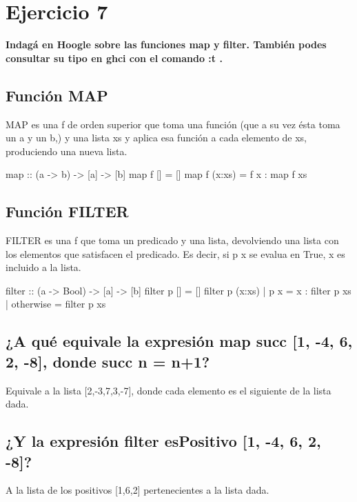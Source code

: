 \documentclass{article}
\begin{document}
\section*{Ejercicio 7}
\textbf{Indagá en Hoogle sobre las funciones map y filter. También podes consultar su tipo en ghci con el comando :t .}

\subsection*{Función MAP}
MAP es una f de orden superior que toma una función (que a su vez ésta toma un a y un b,)  y una lista xs y aplica esa función a cada elemento de xs, produciendo una nueva lista.
\begin{haskell}
map :: (a -> b) -> [a] -> [b]        
map f [] = []                        
map f (x:xs) = f x : map f xs
\end{haskell}

\subsection*{Función FILTER}
FILTER es una f que toma un predicado y una lista,  devolviendo una lista con los elementos que satisfacen el predicado. Es decir, si p x se evalua en True, x es incluido a la lista.
\begin{haskell}
filter :: (a -> Bool) -> [a] -> [b]          
filter p [] = []                           
filter p (x:xs) | p x = x : filter p xs     
                | otherwise = filter p xs
\end{haskell}

\subsection*{¿A qué equivale la expresión map succ [1, -4, 6, 2, -8], donde succ n = n+1?}
Equivale a la lista [2,-3,7,3,-7], donde cada elemento es el siguiente de la lista dada.

\subsection*{¿Y la expresión filter esPositivo [1, -4, 6, 2, -8]?}
A la lista de los positivos [1,6,2] pertenecientes a la lista dada.
\end{document}
